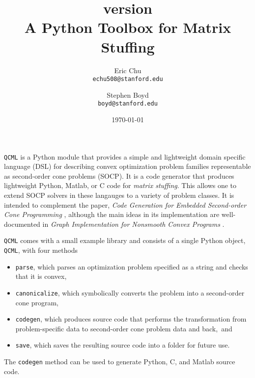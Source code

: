 \documentclass[11pt]{article}
\title{\qcml version \qcmlver \\
A Python Toolbox for Matrix Stuffing}
\author{
Eric Chu\\\texttt{echu508@stanford.edu}
\and
Stephen Boyd\\\texttt{boyd@stanford.edu}
}
\date{\today}
\def\qcml{\texttt{QCML}\xspace}
\begin{document}
  \maketitle
  
\qcml is a Python module that provides a simple and lightweight domain
specific language (DSL) for describing convex optimization problem families
representable as second-order cone problems (SOCP). It is a code generator
that produces lightweight Python, Matlab, or C code for \emph{matrix
stuffing}. This allows one to extend SOCP solvers in these langauges to a 
variety of problem classes. It is intended to complement the paper, 
\emph{Code Generation for Embedded Second-order Cone Programming} \cite{CPD:13}, 
although the main ideas in its
implementation are well-documented in \emph{Graph Implementation for Nonsmooth Convex Programs}
\cite{GB:08}.

\qcml comes with a small example library and consists of a single Python
object, \texttt{QCML}, with four methods
\begin{itemize}
\item {\tt parse}, which parses an optimization problem specified as a
string and checks that it is convex,
\item {\tt canonicalize}, which symbolically converts the problem into
a second-order cone program,
\item {\tt codegen}, which produces source code that performs the
transformation from problem-specific data to second-order cone problem data
and back,~and
\item {\tt save}, which saves the resulting source code into a folder for
future use.
\end{itemize}
The \texttt{codegen} method can be used to generate Python, C, and Matlab
source code.
\end{document}
